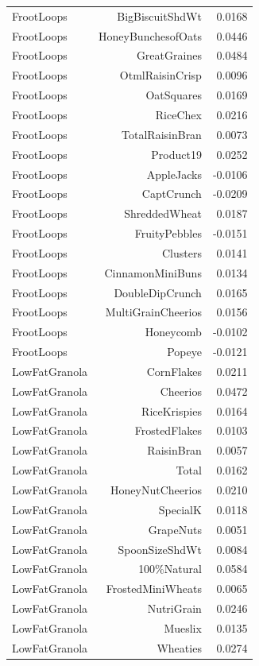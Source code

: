 \begin{longtable}{@{}lrr@{}}
FrootLoops & BigBiscuitShdWt & 0.0168 \\
FrootLoops & HoneyBunchesofOats & 0.0446 \\
FrootLoops & GreatGraines & 0.0484 \\
FrootLoops & OtmlRaisinCrisp & 0.0096 \\
FrootLoops & OatSquares & 0.0169 \\
FrootLoops & RiceChex & 0.0216 \\
FrootLoops & TotalRaisinBran & 0.0073 \\
FrootLoops & Product19 & 0.0252 \\
FrootLoops & AppleJacks & -0.0106 \\
FrootLoops & CaptCrunch & -0.0209 \\
FrootLoops & ShreddedWheat & 0.0187 \\
FrootLoops & FruityPebbles & -0.0151 \\
FrootLoops & Clusters & 0.0141 \\
FrootLoops & CinnamonMiniBuns & 0.0134 \\
FrootLoops & DoubleDipCrunch & 0.0165 \\
FrootLoops & MultiGrainCheerios & 0.0156 \\
FrootLoops & Honeycomb & -0.0102 \\
FrootLoops & Popeye & -0.0121 \\
LowFatGranola & CornFlakes & 0.0211 \\
LowFatGranola & Cheerios & 0.0472 \\
LowFatGranola & RiceKrispies & 0.0164 \\
LowFatGranola & FrostedFlakes & 0.0103 \\
LowFatGranola & RaisinBran & 0.0057 \\
LowFatGranola & Total & 0.0162 \\
LowFatGranola & HoneyNutCheerios & 0.0210 \\
LowFatGranola & SpecialK & 0.0118 \\
LowFatGranola & GrapeNuts & 0.0051 \\
LowFatGranola & SpoonSizeShdWt & 0.0084 \\
LowFatGranola & 100\%Natural & 0.0584 \\
LowFatGranola & FrostedMiniWheats & 0.0065 \\
LowFatGranola & NutriGrain & 0.0246 \\
LowFatGranola & Mueslix & 0.0135 \\
LowFatGranola & Wheaties & 0.0274 \\

\end{longtable}
